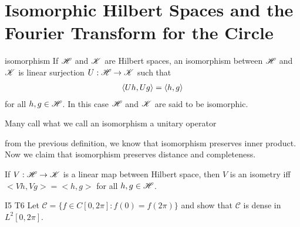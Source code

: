 \chapter{Isomorphic Hilbert Spaces and the Fourier 
Transform for the Circle}\label{chp:1_5}

\begin{definition}{}{isomorphism}
    If $\mathscr{H}$ and $\mathscr{K}$ are Hilbert spaces, an isomorphism between $\mathscr{H}$ and $\mathscr{K}$
    is linear surjection $U:\mathscr{H}\rightarrow \mathscr{K}$ such that
    \begin{align*}
        \langle Uh,Ug\rangle=\langle h,g\rangle
    \end{align*}
    for all $h,g\in \mathscr{H}$. In this case $\mathscr{H}$ and $\mathscr{K}$ are said to be isomorphic.
\end{definition}

\begin{remark}
    Many call what we call an isomorphism a unitary operator
\end{remark}



from the previous definition, we know that isomorphism preserves inner product.
Now we claim that isomorphism preserves distance and completeness. 

\begin{proposition}{}{}
    If $V:\mathscr{H}\rightarrow \mathscr{K}$ is a linear map between Hilbert space, then $V$ is an isometry iff $<Vh,Vg>=<h,g>$ for all $h,g\in \mathscr{H}$.
\end{proposition}


\begin{exercise}{I5 T6}{}
    Let $\mathscr{C}=\{f\in C[0,2\pi]: f(0)=f(2\pi)\}$ and show that $\mathscr{C}$ is dense in $L^2[0,2\pi]$.
\end{exercise}

